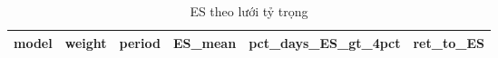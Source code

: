 \begin{table}
\caption{ES theo lưới tỷ trọng}
\label{tab:T14_allocation_es_limits}
\begin{tabular}{lllrrr}
\toprule
model & weight & period & ES\_mean & pct\_days\_ES\_gt\_4pct & ret\_to\_ES \\
\midrule
\bottomrule
\end{tabular}
\end{table}
